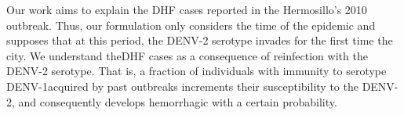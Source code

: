     Our work aims to explain the \ac{DHF} cases reported in the Hermosillo's 
2010 outbreak. Thus, our formulation only considers the time of the epidemic and
supposes that at this period, the \ac{DENV-2} serotype invades for the first 
time the city. We understand the\ac{DHF} cases as a consequence of reinfection 
with the \ac{DENV-2} serotype. That is, a fraction of individuals with immunity 
to serotype \ac{DENV-1}\textemdash acquired by past outbreaks\textemdash 
increments their susceptibility to the \ac{DENV-2}, and consequently 
develops hemorrhagic with a certain probability.
